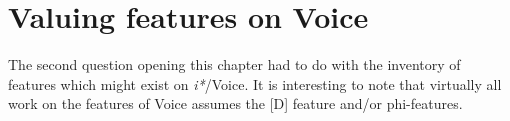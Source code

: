 %
%
%


\section{Valuing features on Voice} \label{i:agree}
The second question opening this chapter had to do with the inventory of features which might exist on \textit{i*}/Voice. It is interesting to note that virtually all work on the features of Voice assumes the [D] feature and/or phi-features.

